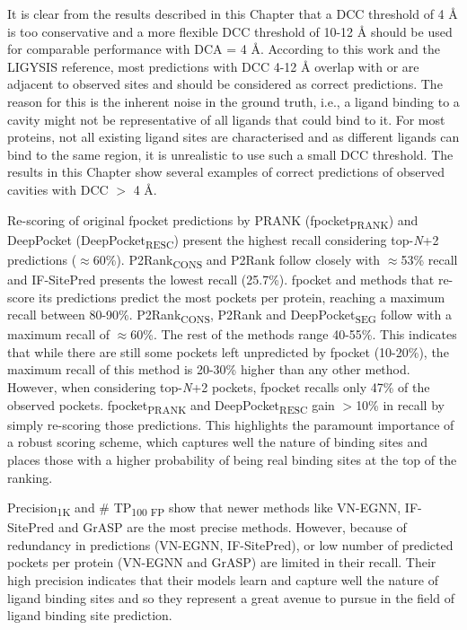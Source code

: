 It is clear from the results described in this Chapter that a DCC threshold of 4 \AA{} is too conservative and a more flexible DCC threshold of 10-12 \AA{} should be used for comparable performance with DCA = 4 \AA{}. According to this work and the LIGYSIS reference, most predictions with DCC 4-12 \AA{} overlap with or are adjacent to observed sites and should be considered as correct predictions. The reason for this is the inherent noise in the ground truth, i.e., a ligand binding to a cavity might not be representative of all ligands that could bind to it. For most proteins, not all existing ligand sites are characterised and as different ligands can bind to the same region, it is unrealistic to use such a small DCC threshold. The results in this Chapter show several examples of correct predictions of observed cavities with DCC $>$ 4 \AA{}.

Re-scoring of original fpocket predictions by PRANK (fpocket\textsubscript{PRANK}) and DeepPocket (DeepPocket\textsubscript{RESC}) present the highest recall considering top-\textit{N}+2 predictions ($\approx$60\%). P2Rank\textsubscript{CONS} and P2Rank follow closely with $\approx$53\% recall and IF-SitePred presents the lowest recall (25.7\%). fpocket and methods that re-score its predictions predict the most pockets per protein, reaching a maximum recall between 80-90\%. P2Rank\textsubscript{CONS}, P2Rank and DeepPocket\textsubscript{SEG} follow with a maximum recall of $\approx$60\%. The rest of the methods range 40-55\%. This indicates that while there are still some pockets left unpredicted by fpocket (10-20\%), the maximum recall of this method is 20-30\% higher than any other method. However, when considering top-\textit{N}+2 pockets, fpocket recalls only 47\% of the observed pockets. fpocket\textsubscript{PRANK} and DeepPocket\textsubscript{RESC} gain $>$10\% in recall by simply re-scoring those predictions. This highlights the paramount importance of a robust scoring scheme, which captures well the nature of binding sites and places those with a higher probability of being real binding sites at the top of the ranking.

\newpage

Precision\textsubscript{1K} and \# TP\textsubscript{100 FP} show that newer methods like VN-EGNN, IF-SitePred and GrASP are the most precise methods. However, because of redundancy in predictions (VN-EGNN, IF-SitePred), or low number of predicted pockets per protein (VN-EGNN and GrASP) are limited in their recall. Their high precision indicates that their models learn and capture well the nature of ligand binding sites and so they represent a great avenue to pursue in the field of ligand binding site prediction.

